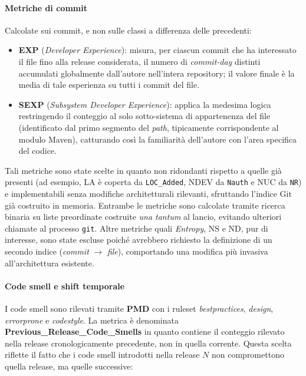 \paragraph{Metriche di commit}
Calcolate sui commit, e non sulle classi a differenza delle precedenti:
\begin{itemize}
    \item \textbf{EXP} (\textit{Developer Experience}): misura, per ciascun commit che ha interessato il file fino alla release considerata, il numero di \textit{commit-day} distinti accumulati globalmente dall'autore nell'intera repository; il valore finale è la media di tale esperienza su tutti i commit del file.
    \item \textbf{SEXP} (\textit{Subsystem Developer Experience}): applica la medesima logica restringendo il conteggio al solo sotto-sistema di appartenenza del file (identificato dal primo segmento del \textit{path}, tipicamente corrispondente al modulo Maven), catturando così la familiarità dell'autore con l'area specifica del codice.
\end{itemize}
Tali metriche sono state scelte in quanto non ridondanti rispetto a quelle già presenti (ad esempio, LA è coperta da \texttt{LOC\_Added}, NDEV da \texttt{Nauth} e NUC da \texttt{NR}) e implementabili senza modifiche architetturali rilevanti, sfruttando l'indice Git già costruito in memoria. Entrambe le metriche sono calcolate tramite ricerca binaria su liste preordinate costruite \textit{una tantum} al lancio, evitando ulteriori chiamate al processo \texttt{git}. Altre metriche quali \textit{Entropy}, NS e ND, pur di interesse, sono state escluse poiché avrebbero richiesto la definizione di un secondo indice (\textit{commit} $\to$ \textit{file}), comportando una modifica più invasiva all'architettura esistente.

\paragraph{Code smell e shift temporale}

I code smell sono rilevati tramite \textbf{PMD} con i ruleset \emph{bestpractices},
\emph{design}, \emph{errorprone} e \emph{codestyle}. La metrica è denominata \newline \textbf{Previous\_Release\_Code\_Smells} in quanto contiene il conteggio rilevato nella
release cronologicamente precedente, non in quella corrente. Questa scelta riflette
il fatto che i code smell introdotti nella release $N$ non compromettono quella release,
ma quelle successive:

